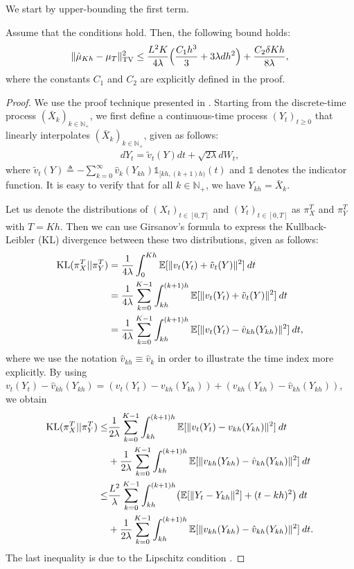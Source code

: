 We start by upper-bounding the first term. 
%
\begin{lemma}
\label{lem:euler}
Assume that the conditions  hold. Then, the following bound holds:
\begin{align}
\| \hat{\mu}_{Kh} - \mu_{T} \|_{\textnormal{TV}}^2 \leq \frac{L^2 K}{4\lambda} \Bigl( \frac{C_1 h^3}{3} + 3 \lambda d h^2 \Bigr) + \frac{C_2 \delta K h}{8\lambda},
\end{align}
where the constants $C_1$ and $C_2$ are explicitly defined in the proof. 
\end{lemma}
%
%
\begin{proof}
We use the proof technique presented in \cite{dalalyan2017theoretical,raginsky17a}. Starting from the discrete-time process $(\bar{X}_k)_{k\in \mathbb{N}_+}$, we first define a continuous-time process $(Y_t)_{t\geq 0}$ that linearly interpolates $(\bar{X}_k)_{k\in \mathbb{N}_+}$, given as follows: 
\begin{align}
d Y_t = \tilde{v}_t(Y) dt + \sqrt{2 \lambda} dW_t, \label{eqn:sde_linear}
\end{align}
where $\tilde{v}_t(Y) \triangleq - \sum_{k=0}^{\infty} \hat{v}_k (Y_{kh}) \mathds{1}_{[kh, (k+1)h)}(t)$ and $\mathds{1}$ denotes the indicator function. It is easy to verify that for all $k \in \mathbb{N}_+$, we have $Y_{kh} = \bar{X}_k$. 

Let us denote the distributions of $(X_t)_{t \in [0,T]}$ and $(Y_t)_{t \in [0,T]}$ as $\pi_{X}^T$ and $\pi_{Y}^T$ with $T = Kh$. Then we can use Girsanov's formula to express the Kullback-Leibler (KL) divergence between these two distributions, given as follows:
\begin{align}
\textnormal{KL} (\pi_{X}^T || \pi_{Y}^T) &= \frac1{4 \lambda} \int_0^{Kh} \mathbb{E}[ \|v_t(Y_t) + \tilde{v}_t(Y) \|^2 ]  \> dt \\
&= \frac1{4 \lambda} \sum_{k=0}^{K-1} \int_{kh}^{(k+1)h} \mathbb{E}[ \|v_t(Y_t) + \tilde{v}_t(Y) \|^2 ] \> dt \\
&= \frac1{4 \lambda} \sum_{k=0}^{K-1} \int_{kh}^{(k+1)h} \mathbb{E}[ \|v_t(Y_t) - \hat{v}_{kh}(Y_{kh}) \|^2 ] \> dt,
\end{align}
where we use the notation $\hat{v}_{kh} \equiv \hat{v}_{k}$ in order to illustrate the time index more explicitly. By using $v_t(Y_t) - \hat{v}_{kh}(Y_{kh}) = ( v_t(Y_t) - v_{kh}(Y_{kh})) + ( v_{kh}(Y_{kh}) - \hat{v}_{kh}(Y_{kh}))$, we obtain
%
\begin{align}
\nonumber \textnormal{KL} (\pi_{X}^T || \pi_{Y}^T) \leq& \frac1{2 \lambda} \sum_{k=0}^{K-1} \int_{kh}^{(k+1)h} \mathbb{E}[ \|v_t(Y_t) - {v}_{kh}(Y_{kh}) \|^2 ] \> dt \\
&+  \frac1{2 \lambda} \sum_{k=0}^{K-1} \int_{kh}^{(k+1)h} \mathbb{E}[ \|v_{kh}(Y_{kh}) - \hat{v}_{kh}(Y_{kh}) \|^2 ] \> dt \\
\nonumber \leq& \frac{L^2}{\lambda} \sum_{k=0}^{K-1} \int_{kh}^{(k+1)h} \bigl(\mathbb{E}[ \|Y_t - Y_{kh} \|^2 ] + (t-kh)^2 \bigr)  \> dt \\
&+  \frac1{2 \lambda} \sum_{k=0}^{K-1} \int_{kh}^{(k+1)h} \mathbb{E}[ \|v_{kh}(Y_{kh}) - \hat{v}_{kh}(Y_{kh}) \|^2 ] \> dt . \label{eqn:lem1_proof_interm}
\end{align}
The last inequality is due to the Lipschitz condition .


\end{proof}
